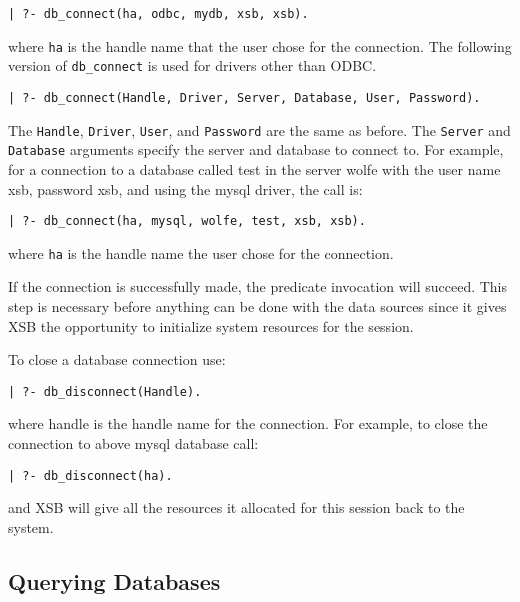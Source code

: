 \begin{verbatim}
| ?- db_connect(ha, odbc, mydb, xsb, xsb).
\end{verbatim}

\noindent
where {\tt ha} is the handle name that the user chose for the connection.
The following version of {\tt db\_connect} is used for drivers other than
ODBC.

\begin{verbatim}
| ?- db_connect(Handle, Driver, Server, Database, User, Password).
\end{verbatim}

The {\tt Handle}, {\tt Driver}, {\tt User},
and {\tt Password} are the same as before. The {\tt Server} and 
{\tt Database} arguments specify the server and database to connect to.
For example, for a connection to a database called test in the server
wolfe with the user name xsb, password xsb, and using the mysql
driver, the call is:

\begin{verbatim}
| ?- db_connect(ha, mysql, wolfe, test, xsb, xsb).
\end{verbatim}

\noindent
where {\tt ha} is the handle name the user chose for the connection.

If the connection is successfully made, the predicate invocation will
succeed.  This step is necessary before anything can be done with the
data sources since it gives XSB the opportunity to initialize system
resources for the session.

To close a database connection use:

\begin{verbatim}
| ?- db_disconnect(Handle).
\end{verbatim}

\noindent
where handle is the handle name for the connection. For example, 
to close the connection to above mysql database call:

\begin{verbatim}
| ?- db_disconnect(ha).
\end{verbatim}

and XSB will give all the resources it allocated for this session back
to the system.


\subsection{Querying Databases}

